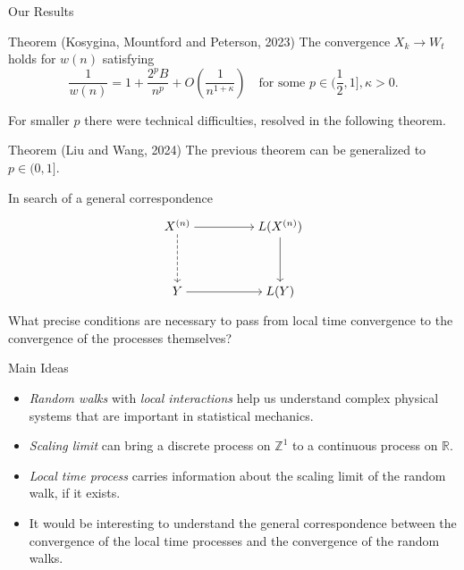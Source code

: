 \documentclass{if-beamer}
\begin{document}
\begin{frame}{Our Results}
    \begin{block}{Theorem (Kosygina, Mountford and Peterson, 2023)}
        The convergence $X_k \to W_t$ holds for $w(n)$ satisfying
        \begin{equation*}
            \frac{1}{w(n)}=1+\frac{2^p B}{n^p}+O\left(\frac{1}{n^{1+\kappa}}\right) \quad \text{for some } p\in (\frac{1}{2}, 1], \kappa>0
        .\end{equation*}
    \end{block}
    \pause
    For smaller $p$ there were technical difficulties, resolved in the following theorem.
    \pause
    \begin{block}{Theorem (Liu and Wang, 2024)}
        The previous theorem can be generalized to $p \in (0,1]$.
    \end{block}
    \pause
    \begin{exampleblock}{In search of a general correspondence}
        \begin{minipage}{0.45\textwidth}
\[\begin{tikzcd}[ampersand replacement=\&,cramped]
	{X^{(n)}} \&\& {L(X^{(n)})} \\
	\\
	Y \&\& {L(Y)}
	\arrow[from=1-1, to=1-3]
	\arrow[from=1-3, to=3-3]
	\arrow[dashed, from=1-1, to=3-1]
	\arrow[from=3-1, to=3-3]
\end{tikzcd}\]
\end{minipage}
\begin{minipage}{0.45\textwidth}

What precise conditions are necessary to pass from local time convergence to the convergence of the processes themselves?
\end{minipage}
    \end{exampleblock}

        
\end{frame}

\begin{frame}{Main Ideas}
    \begin{itemize}
        \item \emph{Random walks} with \emph{local interactions} help us understand complex physical systems that are important in statistical mechanics.
        \item \emph{Scaling limit} can bring a discrete process on $\mathbb{Z}^1$ to a continuous process on $\mathbb{R}$.
        \item \emph{Local time process} carries information about the scaling limit of the random walk, if it exists.
        \item It would be interesting to understand the general correspondence between the convergence of the local time processes and the convergence of the random walks.
    \end{itemize}
\end{frame}
\end{document}
